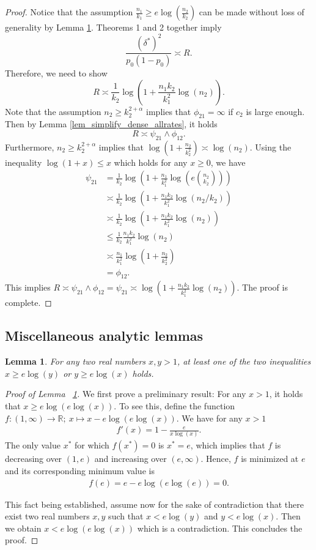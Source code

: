 \documentclass{article}
\newcommand{\R}{\mathbb{R}}
\newtheorem{lemma}{Lemma}
\begin{document}
\begin{proof}
    Notice that the assumption $\frac{n_1}{k_1} \geq e \log(\frac{n_2}{k_2})$ can be made without loss of generality by Lemma \ref{lem_2.6}. Theorems 1 and 2 together imply
    \[\frac{(\delta^*)
^2}{p_0(1-p_0)} \asymp R.\]
Therefore, we need to show
\[R \asymp \frac{1}{k_2}\log\left(1 + \frac{n_1k_2}{k_1^2}\log(n_2)\right).\]
Note that the assumption $n_2 \geq k_2^{2 + \alpha}$ implies that $\phi_{21} = \infty$ if $c_2$ is large enough. 
Then by Lemma \ref{lem_simplify_dense_allrates}, it holds
\[R \asymp \psi_{21} \land \phi_{12}.\]
Furthermore, $n_2 \geq k_2^{2 + \alpha}$ implies that $\log(1 + \frac{n_2}{k_2^2}) \asymp \log(n_2)$. Using the inequality $\log(1 + x) \leq x$ which holds for any $x \geq 0$, we have
\begin{align*}
    \psi_{21} &= \frac{1}{k_2}\log\left(1 + \frac{n_1}{k_1^2}\log\left(e{n_2 \choose k_2}\right)\right)\\
    &\asymp \frac{1}{k_2}\log\left(1 + \frac{n_1k_2}{k_1^2}\log(n_2 / k_2)\right) \\&\asymp \frac{1}{k_2} \log\left(1 + \frac{n_1k_2}{k_1^2}\log(n_2)\right) \\
    &\leq \frac{1}{k_2} \frac{n_1k_2}{k_1^2}\log(n_2) \\
    &\asymp \frac{n_1}{k_1^2}\log\left(1 + \frac{n_2}{k_2^2}\right)\\
    & = \phi_{12}.
\end{align*}
This implies $R \asymp \psi_{21} \land \phi_{12} = \psi_{21} \asymp \log\left(1 + \frac{n_1k_2}{k_1^2}\log(n_2)\right)$. The proof is complete.
\end{proof}
\subsection{Miscellaneous analytic lemmas}

\begin{lemma}\label{lem_2.6}
    For any two real numbers $x,y>1$, at least one of the two inequalities $x \geq e \log(y)$ or $y \geq e\log(x)$ holds.
\end{lemma}
\begin{proof}[Proof of Lemma ~\ref{lem_2.6}]
    We first prove a preliminary result: For any $x > 1$, it holds that $x \geq e\log(e \log(x))$. 
    To see this, define the function $f: (1,\infty) \to \R;~ x \mapsto x - e\log(e \log(x))$. We have for any $x>1$
    \begin{align*}
        f'(x) = 1 - \frac{e}{x\log(x)}.
    \end{align*}
    The only value $x^*$ for which $f(x^*)=0$ is $x^* = e$, which implies that $f$ is decreasing over $(1,e)$ and increasing over $(e,\infty)$. Hence, $f$ is minimized at $e$ and its corresponding minimum value is
    \begin{align*}
        f(e) = e - e\log(e\log(e)) = 0.
    \end{align*}

    This fact being established, assume now for the sake of contradiction that there exist two real numbers $x,y$ such that $x<e \log(y)$ and $y< e\log(x)$. 
    Then we obtain $x< e\log(e\log(x))$ which is a contradiction. This concludes the proof.
\end{proof}
\end{document}
